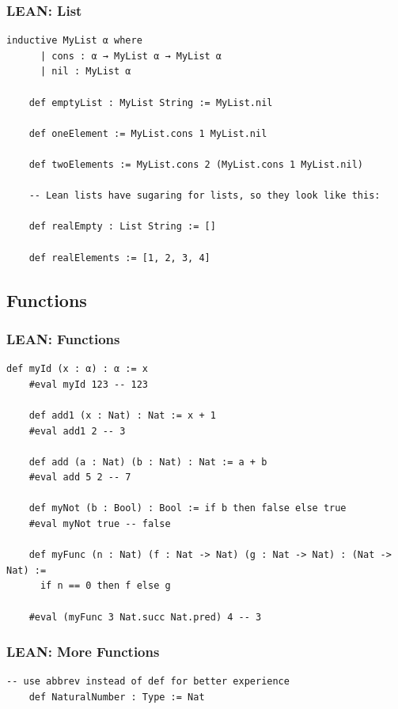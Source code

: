 \documentclass{beamer}
\begin{document}
\begin{frame}[fragile]
  \frametitle{LEAN: List}

  \begin{lstlisting}[language=lean]
    inductive MyList α where
      | cons : α → MyList α → MyList α
      | nil : MyList α

    def emptyList : MyList String := MyList.nil

    def oneElement := MyList.cons 1 MyList.nil

    def twoElements := MyList.cons 2 (MyList.cons 1 MyList.nil)

    -- Lean lists have sugaring for lists, so they look like this:

    def realEmpty : List String := []

    def realElements := [1, 2, 3, 4]
  \end{lstlisting}
\end{frame}

\subsection{Functions}

\begin{frame}[fragile]
  \frametitle{LEAN: Functions}

  \begin{lstlisting}[language=lean]
    def myId (x : α) : α := x
    #eval myId 123 -- 123

    def add1 (x : Nat) : Nat := x + 1
    #eval add1 2 -- 3

    def add (a : Nat) (b : Nat) : Nat := a + b
    #eval add 5 2 -- 7

    def myNot (b : Bool) : Bool := if b then false else true
    #eval myNot true -- false

    def myFunc (n : Nat) (f : Nat -> Nat) (g : Nat -> Nat) : (Nat -> Nat) :=
      if n == 0 then f else g

    #eval (myFunc 3 Nat.succ Nat.pred) 4 -- 3
  \end{lstlisting}
\end{frame}

\begin{frame}[fragile]
  \frametitle{LEAN: More Functions}

  \begin{lstlisting}[language=lean]
    -- use abbrev instead of def for better experience
    def NaturalNumber : Type := Nat

  \end{lstlisting}
\end{frame}
\end{document}
